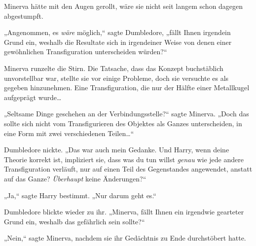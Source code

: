 Minerva hätte mit den Augen gerollt, wäre sie nicht seit langem schon dagegen abgestumpft.

„Angenommen, es \emph{wäre} möglich,“ sagte Dumbledore, „fällt Ihnen irgendein Grund ein, weshalb die Resultate sich in irgendeiner Weise von denen einer gewöhnlichen Transfiguration unterscheiden würden?“

Minerva runzelte die Stirn. Die Tatsache, dass das Konzept buchstäblich unvorstellbar war, stellte sie vor einige Probleme, doch sie versuchte es als gegeben hinzunehmen. Eine Transfiguration, die nur der Hälfte einer Metallkugel aufgeprägt wurde…

„Seltsame Dinge geschehen an der Verbindungsstelle?“ sagte Minerva. „Doch das sollte sich nicht vom Transfigurieren des Objektes als Ganzes unterscheiden, in eine Form mit zwei verschiedenen Teilen…“

Dumbledore nickte. „Das war auch mein Gedanke. Und Harry, wenn deine Theorie korrekt ist, impliziert sie, dass was du tun willst \emph{genau} wie jede andere Transfiguration verläuft, nur auf einen Teil des Gegenstandes angewendet, anstatt auf das Ganze? \emph{Überhaupt} keine Änderungen?“

„Ja,“ sagte Harry bestimmt. „Nur darum geht es.“

Dumbledore blickte wieder zu ihr. „Minerva, fällt Ihnen ein irgendwie gearteter Grund ein, weshalb das gefährlich sein sollte?“

„Nein,“ sagte Minerva, nachdem sie ihr Gedächtnis zu Ende durchstöbert hatte.

